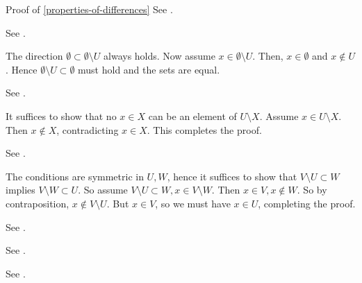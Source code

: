\begin{Proof}{Proof of \cref{properties-of-differences}}
    See \cite{proof-wiki:set-difference-as-symmetric-difference-with-intersection}.

    See \cite{proof-wiki:set-difference-with-set-difference-is-union-of-set-difference-with-intersection}.

    The direction $\emptyset \subset \emptyset \setminus U$ always holds.
    Now assume $x \in \emptyset \setminus U$. Then, $x \in \emptyset$ and $x \nin U$. Hence $\emptyset \setminus U \subset \emptyset$ must hold and the sets are equal.

    See \cite{proof-wiki:set-difference-with-empty-set-is-self}.

    It suffices to show that no $x \in X$ can be an element of $U \setminus X$.
    Assume $x \in U \setminus X$. Then $x \nin X$, contradicting $x \in X$.
    This completes the proof.

    See \cite{proof-wiki:set-difference-with-self-is-empty-set}.

    The conditions are symmetric in $U,W$, hence it suffices to show that $V \setminus U \subset W$ implies $V \setminus W \subset U$.
    So assume $V \setminus U \subset W, x \in V \setminus W$. Then $x \in V, x \nin W$. So by contraposition, $x \nin V \setminus U$. But $x \in V$, so we must have $x \in U$, completing the proof.

    See \cite{proof-wiki:characteristic-function-of-set-difference}.

    See \cite{proof-wiki:image-of-set-difference-under-mapping}.

    See \cite{proof-wiki:preimage-of-set-difference-under-mapping}.
\end{Proof}
